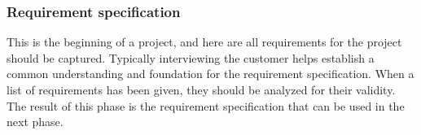 \subsubsection{Requirement specification}


This is the beginning of a project, and here are all requirements for the project should be captured\cite{waterfallexplained}. Typically interviewing the customer helps establish a common understanding and foundation for the requirement specification. When a list of requirements has been given, they should be analyzed for their validity\cite{waterfallexplained}. The result of this phase is the requirement specification that can be used in the next phase\cite{waterfallexplained}.